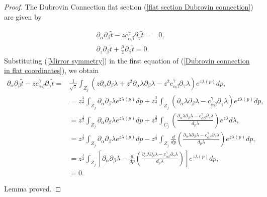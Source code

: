 \documentclass[10pt,a4paper]{amsart}
\begin{document}
\begin{proof}


The Dubrovin Connection flat section (\ref{flat section Dubrovin connection}) are given by

\begin{equation}\label{Dubrovin connection in flat coordinates}
\begin{split}
\partial_{\alpha}\partial_{\beta}\tilde t-zc_{\alpha\beta}^{\gamma}\partial_{\gamma}\tilde t=&0,\\
\partial_{z}\partial_{\beta}\tilde t+\frac{\mu}{z}\partial_{\beta}\tilde t=0.
\end{split}
\end{equation}
Substituting (\ref{Mirror symmetry}) in the first equation of  (\ref{Dubrovin connection in flat coordinates}), we obtain
\begin{equation}\label{Adam identity part 1}
\begin{split}
\partial_{\alpha}\partial_{\beta}\tilde t-zc_{\alpha\beta}^{\gamma}\partial_{\gamma}\tilde t=&\frac{1}{\sqrt{z}}\int_{Z_j} \left(z\partial_{\alpha}\partial_{\beta}\lambda +z^2\partial_{\alpha}\lambda\partial_{\beta}\lambda-z^2c_{\alpha\beta}^{\gamma}\partial_{\gamma}\lambda\right)e^{z\lambda(p)}dp,\\
&=z^{\frac{1}{2}}\int_{Z_j} \partial_{\alpha}\partial_{\beta}\lambda e^{z\lambda(p)}dp+z^{\frac{3}{2}}\int_{Z_j} \left(\partial_{\alpha}\lambda\partial_{\beta}\lambda-c_{\alpha\beta}^{\gamma}\partial_{\gamma}\lambda\right)e^{z\lambda(p)}dp,\\
&=z^{\frac{1}{2}}\int_{Z_j} \partial_{\alpha}\partial_{\beta}\lambda e^{z\lambda(p)}dp+z^{\frac{3}{2}}\int_{C_j} \left(\frac{\partial_{\alpha}\lambda\partial_{\beta}\lambda-c_{\alpha\beta}^{\gamma}\partial_{\gamma}\lambda}{d_p\lambda}\right)e^{z\lambda}d\lambda,\\
&=z^{\frac{1}{2}}\int_{Z_j} \partial_{\alpha}\partial_{\beta}\lambda e^{z\lambda(p)}dp-z^{\frac{1}{2}}\int_{Z_j} \frac{d}{dp}\left(\frac{\partial_{\alpha}\lambda\partial_{\beta}\lambda-c_{\alpha\beta}^{\gamma}\partial_{\gamma}\lambda}{d_p\lambda}\right)e^{z\lambda(p)}dp,\\
&=z^{\frac{1}{2}}\int_{Z_j}\left[ \partial_{\alpha}\partial_{\beta}\lambda - \frac{d}{dp}\left(\frac{\partial_{\alpha}\lambda\partial_{\beta}\lambda-c_{\alpha\beta}^{\gamma}\partial_{\gamma}\lambda}{d_p\lambda}\right)\right]e^{z\lambda(p)}dp,\\
&=0.
\end{split}
\end{equation}



Lemma proved.





\end{proof}
\end{document}
